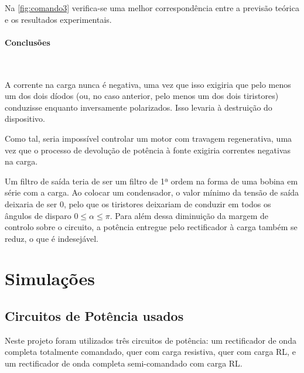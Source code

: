 \documentclass[a4paper,11pt]{article}
\numberwithin{equation}{section}
\begin{document}
Na \autoref{fig:comando3} verifica-se uma melhor correspondência entre a previsão teórica e os resultados experimentais.

\paragraph{Conclusões} \mbox{}\

A corrente na carga nunca é negativa, uma vez que isso exigiria que pelo menos um dos dois díodos (ou, no caso anterior, pelo menos um dos dois tiristores) conduzisse enquanto inversamente polarizados. Isso levaria à destruição do dispositivo.



Como tal, seria impossível controlar um motor com travagem regenerativa, uma vez que o processo de devolução de potência à fonte exigiria correntes negativas na carga.


Um filtro de saída teria de ser um filtro de 1ª ordem na forma de uma bobina em série com a carga. Ao colocar um condensador, o valor mínimo da tensão de saída deixaria de ser $0$, pelo que os tiristores deixariam de conduzir em todos os ângulos de disparo $0\leq \alpha \leq \pi$. Para além dessa diminuição da margem de controlo sobre o circuito, a potência entregue pelo rectificador à carga também se reduz, o que é indesejável.


\pagebreak
\section{Simulações}
\subsection{Circuitos de Potência usados}

Neste projeto foram utilizados três circuitos de potência: um rectificador de onda completa totalmente comandado, quer com carga resistiva, quer com carga RL, e um rectificador de onda completa semi-comandado com carga RL. 
\end{document}
